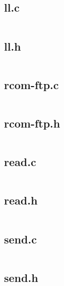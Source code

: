 \documentclass[11pt]{article}
\begin{document}
\subsection*{ll.c}

\inputminted{c}{ll.c}

\newpage

\subsection*{ll.h}

\inputminted{c}{ll.h}

\newpage

\subsection*{rcom-ftp.c}

\inputminted{c}{rcom-ftp.c}

\newpage

\subsection*{rcom-ftp.h}

\inputminted{c}{rcom-ftp.h}

\newpage

\subsection*{read.c}

\inputminted{c}{read.c}

\newpage

\subsection*{read.h}

\inputminted{c}{read.h}

\newpage

\subsection*{send.c}

\inputminted{c}{send.c}

\newpage

\subsection*{send.h}

\inputminted{c}{send.h}
\end{document}
